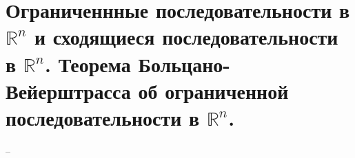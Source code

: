 \section{Ограниченнные последовательности в $\mathbb{R}^n$ и сходящиеся последовательности в $\mathbb{R}^n$. Теорема Больцано-Вейерштрасса об ограниченной последовательности в $\mathbb{R}^n$.}
--
\newline